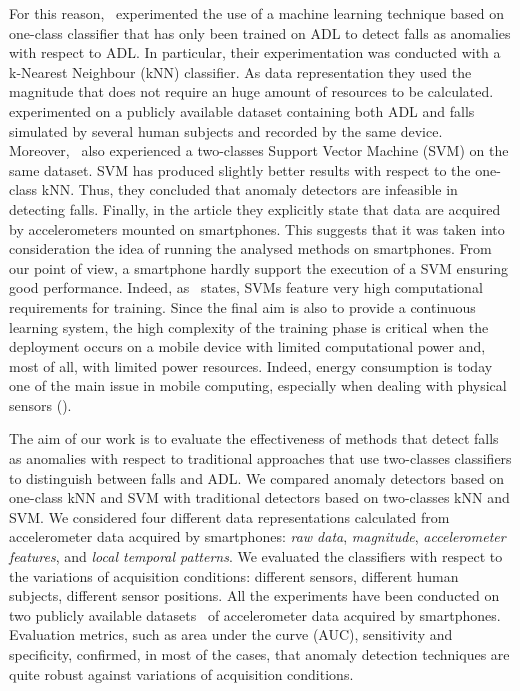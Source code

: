 \documentclass[twocolumn]{svjour3}          \smartqed  \usepackage[draft]{hyperref}
\begin{document}
For this reason,~\citet{medrano2014} experimented the use of a machine learning technique based on one-class classifier that has only been trained on ADL to detect falls as anomalies with respect to ADL. In particular, their experimentation was conducted with a k-Nearest Neighbour (kNN) classifier. As data representation they used the magnitude that does not require an huge amount of resources to be calculated. 
\citet{medrano2014} experimented on a publicly available dataset containing both ADL and falls 
 simulated by several human subjects and recorded by the same device. Moreover,~\citet{medrano2014} also experienced a two-classes Support Vector Machine (SVM) on the same dataset. SVM has produced slightly better results with respect to the one-class kNN. Thus, they concluded that anomaly detectors are infeasible in detecting falls.
Finally, in the article they explicitly state that data are acquired by accelerometers mounted on smartphones. This suggests that it was taken into consideration the idea of running the analysed methods on smartphones. From our point of view, a smartphone hardly support the execution of a SVM ensuring good performance.
Indeed, as~\citet{Mazhelis06} states, SVMs feature very high computational requirements for training. Since the final aim is also to provide a continuous learning system, the high complexity of the training phase is critical when the deployment occurs on a mobile device with limited computational power and, most of all, with limited power resources. Indeed, energy consumption is today one of the main issue in mobile computing, especially when dealing with physical sensors (\citet{Pejovic:2015}).


The aim of our work is to evaluate the effectiveness of methods that detect falls as anomalies with respect to traditional approaches that use two-classes classifiers to distinguish between falls and ADL. We compared anomaly detectors based on one-class kNN and SVM with traditional detectors based on two-classes kNN and SVM. We considered four different data representations calculated from accelerometer data acquired by smartphones: \emph{raw data}, \emph{magnitude}, \emph{accelerometer features}, and \emph{local temporal patterns}.  We evaluated the classifiers with respect to the variations of acquisition conditions: different sensors, different human subjects, different sensor positions. All the experiments have been conducted on two publicly available datasets~\citep{medrano2014,anguita2013public} of accelerometer data acquired by smartphones. Evaluation metrics, such as area under the curve (AUC), sensitivity and specificity, confirmed, in most of the cases, that anomaly detection techniques are quite robust against variations of acquisition conditions. 
\end{document}
